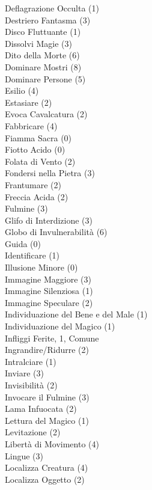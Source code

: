 \begin{multicols}{3}
{	Deflagrazione Occulta (1)\\
	Destriero Fantasma (3)\\
	Disco Fluttuante (1)\\
	Dissolvi Magie (3)\\
	Dito della Morte (6)\\
	Dominare Mostri (8)\\
	Dominare Persone (5)\\
	Esilio (4)\\
	Estasiare (2)\\
	Evoca Cavalcatura (2)\\
	Fabbricare (4)\\
	Fiamma Sacra (0)\\
	Fiotto Acido (0)\\
	Folata di Vento (2)\\
	Fondersi nella Pietra (3)\\
	Frantumare (2)\\
	Freccia Acida (2)\\
	Fulmine (3)\\
	Glifo di Interdizione (3)\\
	Globo di Invulnerabilità (6)\\
	Guida (0)\\
	Identificare (1)\\
	Illusione Minore (0)\\
	Immagine Maggiore (3)\\
	Immagine Silenziosa (1)\\
	Immagine Speculare (2)\\
	Individuazione del Bene e del Male (1)\\
	Individuazione del Magico (1)\\
	Infliggi Ferite, 1, Comune \\
	Ingrandire/Ridurre (2)\\
	Intralciare (1)\\
	Inviare (3)\\
	Invisibilità (2)\\
	Invocare il Fulmine (3)\\
	Lama Infuocata (2)\\
	Lettura del Magico (1)\\
	Levitazione (2)\\
	Libertà di Movimento (4)\\
	Lingue (3)\\
	Localizza Creatura (4)\\
	Localizza Oggetto (2)\\
}
\end{multicols}
